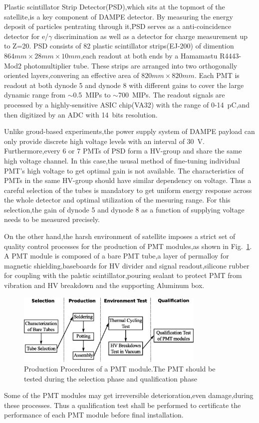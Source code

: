 \documentclass[preprint,5p,times]{elsarticle}
\begin{document}
Plastic scintillator Strip Detector(PSD),which sits at the topmost of the satellite,is a key component of DAMPE detector.
By measuring the energy deposit of particles pentrating through it,PSD serves as a anti-coincidence detector for e/$\gamma$ discrimination as well as a detector for charge measurement up to Z=20.
PSD consists of 82 plastic scintillator strips(EJ-200\cite{ej200}) of dimention $864mm\times28mm\times10mm$,each readout at both ends by a Hamamastu R4443-Mod2 photomultiplier tube.
These strips are arranged into two orthogonally oriented layers,convering an effective area of $820mm\times820mm$.
Each PMT is readout at both dynode 5 and dynode 8 with different gains to cover the large dynamic range from $\sim$0.5~MIPs to $\sim$700~MIPs.
The readout signals are processed by a highly-sensitive ASIC chip(VA32) with the range of 0-14~pC,and then digitized by an ADC with 14~bits resolution.

Unlike groud-based experiments,the power supply system of DAMPE payload can only provide discrete high voltage levels with an interval of 30~V.
Furthermore,every 6 or 7 PMTs of PSD form a HV-group and share the same high voltage channel.
In this case,the ususal method of fine-tuning individual PMT's high voltage to get optimal gain is not available.  
The characteristics of PMTs in the same HV-group should have similar dependency on voltage.
Thus a careful selection of the tubes is mandatory to get uniform energy response across the whole detector and optimal utilization of the mesuring range.
For this selection,the gain of dynode 5 and dynode 8 as a function of supplying voltage needs to be measured precisely.  

On the other hand,the harsh environment of satellite imposes a strict set of quality control processes for the production of PMT modules,as shown in Fig.~\ref{fig:production_procedure}.
A PMT module is composed of a bare PMT tube,a layer of permalloy for magnetic shielding,baseboards for HV divider and signal readout,silicone rubber for coupling with the palstic scintillator,pouring sealant to protect PMT from vibration and HV breakdown and the supporting Aluminum box.
\begin{figure}[h!]
 \centering
 \includegraphics[width=90mm]{pmt_production_procedure}
\caption{Production Procedures of a PMT module.The PMT should be tested during the selection phase and qualification phase}
\label{fig:production_procedure}
\end{figure} 
Some of the PMT modules may get irreversible deterioration,even damage,during these processes.
Thus a qualification test shall be performed to certificate the performance of each PMT module before final installation. 
\end{document}

